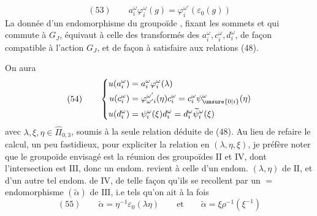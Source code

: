 \[
(53)\qquad a_i^\omega\varphi_i^\omega(g)=\varphi_i^{\omega'}(\varepsilon_0(g))
\]
La donnée d'un endomorphisme du groupoïde , fixant les sommets et qui commute à $G_J$, équivaut à celle des  transformés des $a_i^\omega,c_i^\omega,d_i^\omega$, de façon  compatible à l'action  $G_J$, et de façon à satisfaire aux relations (48).

On aura
\[
(54)\qquad\left\{\begin{aligned}
u(a_i^\omega)&=a_i^\omega\varphi_i^\omega(\lambda)\\
u(c_i^\omega)&=\varphi_{\omega'i}^{\omega'}(\eta)c_i^\omega=c_i^\omega\psi_{\unsure{0|i}}^\omega(\eta)\\
u(d_i^\omega)&=\psi_i^\omega(\xi)d_i^\omega=d_i^\omega\widetilde\psi_i^\omega(\xi)
\end{aligned}\right.
\]
avec $\lambda,\xi,\eta\in\widehat\Pi_{0,3}$, soumis à la seule relation déduite de (48). Au lieu de refaire le calcul, un peu fastidieux, pour expliciter la relation en $(\lambda,\eta,\xi)$, je préfère noter que le  groupoïde envisagé est la réunion des groupoïdes $\mathrm{II}$ et $\mathrm{IV}$, dont l'intersection est $\mathrm{III}$, donc un endom.  revient à celle d'un  endom. $(\lambda,\eta)$ de $\mathrm{II}$, et d'un autre tel endom. \inserted{$\xi$} de $\mathrm{IV}$, de telle façon qu'ils se recollent  par un $=$ endomorphisme $(\widetilde\alpha)$ de $\mathrm{III}$, i.e tels qu'on ait à la fois
\[
(55)\qquad\widetilde\alpha=\eta^{-1}\varepsilon_0(\lambda\eta)\qquad\text{et}\qquad
\widetilde\alpha=\xi\rho^{-1}(\xi^{-1})
\]
